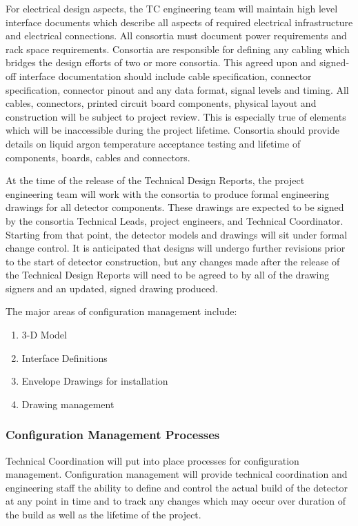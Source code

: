 For electrical design aspects, the TC
engineering team will maintain high level interface documents which
describe all aspects of required electrical infrastructure and
electrical connections.  All consortia must document power
requirements and rack space requirements.  Consortia are responsible
for defining any cabling which bridges the design efforts of two or
more consortia.  This agreed upon and signed-off interface
documentation should include cable specification, connector
specification, connector pinout and any data format, signal levels and
timing.  All cables, connectors, printed circuit board components,
physical layout and construction will be subject to project review.
This is especially true of elements which will be inaccessible during
the project lifetime.  Consortia should provide details on liquid
argon temperature acceptance testing and lifetime of components,
boards, cables and connectors.


At the time of the release of the Technical Design Reports, the
project engineering team will work with the consortia to produce
formal engineering drawings for all detector components.  These
drawings are expected to be signed by the consortia Technical Leads,
project engineers, and Technical Coordinator.  Starting from that
point, the detector models and drawings will sit under formal change
control.  It is anticipated that designs will undergo further
revisions prior to the start of detector construction, but any changes
made after the release of the Technical Design Reports will need to be
agreed to by all of the drawing signers and an updated, signed drawing
produced.

The major areas of configuration management include:
\begin{enumerate}
  \item 3-D Model
  \item Interface Definitions
  \item Envelope Drawings for installation
  \item Drawing management
\end{enumerate}

\subsubsection{Configuration Management Processes}
\label{ssec:fdsp-coord-integ-cnfg-mgmt}

Technical Coordination will put into place processes for
configuration management.  Configuration management will provide
technical coordination and engineering staff the ability to define and
control the actual build of the detector at any point in time and to
track any changes which may occur over duration of the build as well
as the lifetime of the project.

